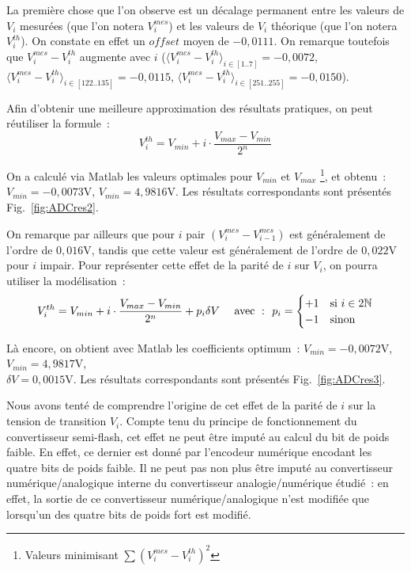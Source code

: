 \documentclass{article}
\begin{document}

La première chose que l'on observe est un décalage permanent entre les valeurs de $V_i$ mesurées (que l'on notera $V_i^{mes}$) et les valeurs de $V_i$ théorique (que l'on notera $V_i^{th}$). On constate en effet un $offset$ moyen de $-0,0111$. On remarque toutefois que $V_i^{mes}-V_i^{th}$ augmente avec $i$ (${\langle V_i^{mes}-V_i^{th}\rangle_{i\in[1..7]}=-0,0072}$, ${\langle V_i^{mes}-V_i^{th}\rangle_{i\in[122..135]}=-0,0115}$, ${\langle V_i^{mes}-V_i^{th}\rangle_{i\in[251..255]}=-0,0150}$). 

Afin d'obtenir une meilleure approximation des résultats pratiques, on peut réutiliser la formule~:
\begin{equation*}
V_i^{th} = V_{min}+i\cdot\frac{V_{max}-V_{min}}{2^n}
\end{equation*}

On a calculé via Matlab les valeurs optimales pour $V_{min}$ et $V_{max}$ \footnote{Valeurs minimisant $\sum (V_i^{mes}-V_i^{th})^2$}, et obtenu~: ${V_{min}=-0,0073\mathrm{V}}$, ${V_{min}=4,9816\mathrm{V}}$. Les résultats correspondants sont présentés Fig.~\ref{fig:ADCres2}.

On remarque par ailleurs que pour $i$ pair $(V_i^{mes}-V_{i-1}^{mes})$ est généralement de l'ordre de $0,016\mathrm{V}$, tandis que cette valeur est généralement de l'ordre de $0,022\mathrm{V}$ pour $i$ impair. Pour représenter cette effet de la parité de $i$ sur $V_i$, on pourra utiliser la modélisation~: 
\begin{equation*}
V_i^{th} = V_{min}+i\cdot\frac{V_{max}-V_{min}}{2^n}+p_i\delta V \mathrm{~~~~avec~:~~}p_i = \begin{cases} +1 &\mathrm{si~} i\in 2\mathbb{N} \\ -1 & \mbox{sinon}\end{cases}
\end{equation*}

Là encore, on obtient avec Matlab les coefficients optimum~: ${V_{min}=-0,0072\mathrm{V}}$, ${V_{min}=4,9817\mathrm{V}}$, \\${\delta V=0,0015\mathrm{V}}$. Les résultats correspondants sont présentés Fig.~\ref{fig:ADCres3}.



Nous avons tenté de comprendre l'origine de cet effet de la parité de $i$ sur la tension de transition $V_i$. Compte tenu du principe de fonctionnement du convertisseur semi-flash, cet effet ne peut être imputé au calcul du bit de poids faible. En effet, ce dernier est donné par l'encodeur numérique encodant les quatre bits de poids faible. Il ne peut pas non plus être imputé au convertisseur numérique/analogique interne du convertisseur analogie/numérique étudié~: en effet, la sortie de ce convertisseur numérique/analogique n'est modifiée que lorsqu'un des quatre bits de poids fort est modifié. 
\end{document}
